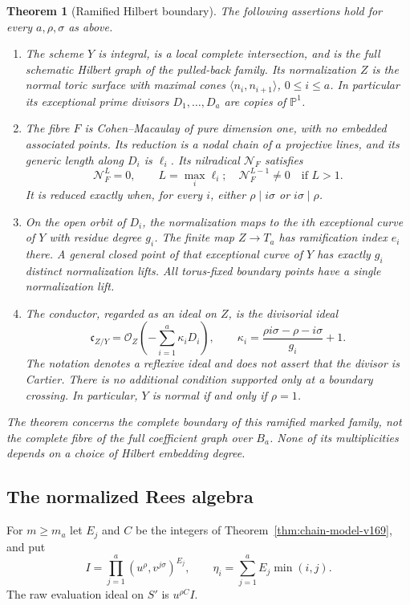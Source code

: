 \documentclass[11pt,reqno]{amsart}
\numberwithin{equation}{section}
\newtheorem{theorem}{Theorem}[section]
\theoremstyle{definition}\newtheorem{definition}[theorem]{Definition}
\theoremstyle{remark}\newtheorem{remark}[theorem]{Remark}
\newcommand{\Pj}{\mathbb P}\newcommand{\A}{\mathbb A}
\newcommand{\OO}{\mathcal O}\newcommand{\II}{\mathcal I}
\begin{document}
\begin{theorem}[Ramified Hilbert boundary]\label{thm:ramified-boundary-v170}
The following assertions hold for every $a,\rho,\sigma$ as above.
\begin{enumerate}
\item The scheme $Y$ is integral, is a local complete intersection,
and is the full schematic Hilbert graph of the pulled-back family.
Its normalization $Z$ is the normal toric surface with maximal cones
$\langle n_i,n_{i+1}\rangle$, $0\leq i\leq a$. In particular its
exceptional prime divisors $D_1,\ldots,D_a$ are copies of $\Pj^1$.
\item The fibre $F$ is Cohen--Macaulay of pure dimension one, with
no embedded associated points. Its reduction is a nodal chain of
$a$ projective lines, and its generic length along $D_i$ is $\ell_i$.
Its nilradical $\mathcal N_F$ satisfies
\[
 \mathcal N_F^{L}=0,\qquad L=\max_i\ell_i;
 \quad \mathcal N_F^{L-1}\ne0\quad\text{if }L>1.
\]
It is reduced exactly when, for every $i$, either $\rho\mid i\sigma$
or $i\sigma\mid\rho$.
\item On the open orbit of $D_i$, the normalization maps to the
$i$th exceptional curve of $Y$ with residue degree $g_i$. The finite
map $Z\to T_a$ has ramification index $e_i$ there. A general closed
point of that exceptional curve of $Y$ has exactly $g_i$ distinct
normalization lifts. All torus-fixed boundary points have a single
normalization lift.
\item The conductor, regarded as an ideal on $Z$, is the divisorial
ideal
\begin{equation}\label{eq:conductor-divisor-v170}
 \mathfrak c_{Z/Y}=\OO_Z\left(-\sum_{i=1}^a\kappa_iD_i\right),
 \qquad
 \kappa_i=\frac{\rho i\sigma-\rho-i\sigma}{g_i}+1.
\end{equation}
The notation denotes a reflexive ideal and does not assert that the
divisor is Cartier. There is no additional condition supported only
at a boundary crossing. In particular, $Y$ is normal if and only if
$\rho=1$.
\end{enumerate}
The theorem concerns the complete boundary of this ramified marked
family, not the complete fibre of the full coefficient graph over
$B_a$. None of its multiplicities depends on a choice of Hilbert
embedding degree.
\end{theorem}

\subsection{The normalized Rees algebra}
For $m\geq m_a$ let $E_j$ and $C$ be the integers of
Theorem~\ref{thm:chain-model-v169}, and put
\[
 I=\prod_{j=1}^a(u^\rho,v^{j\sigma})^{E_j},\qquad
 \eta_i=\sum_{j=1}^a E_j\min(i,j).
\]
The raw evaluation ideal on $S'$ is $u^{\rho C}I$.
\end{document}
